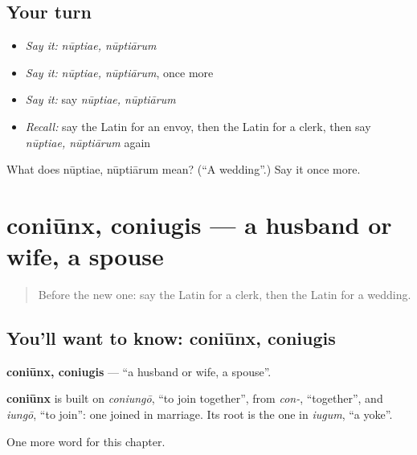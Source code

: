 \subsection*{Your turn}
\begin{itemize}
\raggedright
  \item \emph{Say it:} \emph{nūptiae, nūptiārum}
  \item \emph{Say it:} \emph{nūptiae, nūptiārum}, once more
  \item \emph{Say it:} say \emph{nūptiae, nūptiārum}
  \item \emph{Recall:} say the Latin for an envoy, then the Latin for a clerk, then say \emph{nūptiae, nūptiārum} again
\end{itemize}

\begin{tcolorbox}[breakable,colback=teal!4,colframe=teal!35!black,title={Before you move on}]
What does nūptiae, nūptiārum mean? (\textquotedblleft{}A wedding\textquotedblright{}.) Say it once more.
\end{tcolorbox}
\section[coniūnx, coniugis]{coniūnx, coniugis — a husband or wife, a spouse}

\label{lesson:LA-C273-coniunx}



\begin{quote}
Before the new one: say the Latin for a clerk, then the Latin for a wedding.
\end{quote}

\subsection*{You'll want to know: coniūnx, coniugis}
\textbf{coniūnx, coniugis} — \textquotedblleft{}a husband or wife, a spouse\textquotedblright{}.

\begin{cousinweb}
\textbf{coniūnx} is built on \emph{coniungō}, \textquotedblleft{}to join together\textquotedblright{}, from \emph{con-}, \textquotedblleft{}together\textquotedblright{}, and \emph{iungō}, \textquotedblleft{}to join\textquotedblright{}: one joined in marriage. Its root is the one in \emph{iugum}, \textquotedblleft{}a yoke\textquotedblright{}.
\end{cousinweb}

\begin{grammarlens}[title={What you've built}]
One more word for this chapter.
\end{grammarlens}


